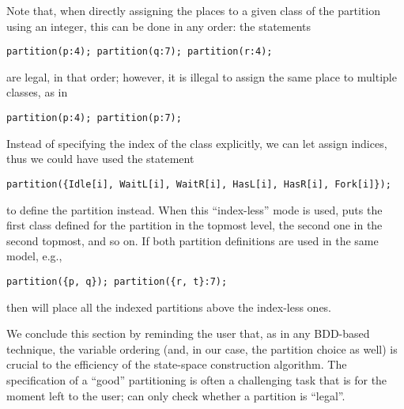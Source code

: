 Note that, when directly assigning the places to a given class of the
partition using an integer, this can be done in any order:
the statements
\begin{lstlisting}
partition(p:4); partition(q:7); partition(r:4); 
\end{lstlisting}
are legal, in that order; however, it is illegal to assign the same
place  to multiple classes, as in
\begin{lstlisting}
partition(p:4); partition(p:7);
\end{lstlisting}


Instead of specifying the index of the class explicitly, we can let
{\smart} assign indices, thus we could have used the statement
\begin{lstlisting}
partition({Idle[i], WaitL[i], WaitR[i], HasL[i], HasR[i], Fork[i]});
\end{lstlisting}
to define the partition instead.
When this ``index-less'' mode is used, {\smart} puts the first
class defined for the partition in the topmost level, the second one in
the second topmost, and so on.
If both partition definitions are used in the same model,
e.g.,
\begin{lstlisting}
partition({p, q}); partition({r, t}:7);
\end{lstlisting}
then {\smart} will place all the indexed partitions above the index-less ones.


We conclude this section by reminding the user that,
as in any BDD-based technique, the variable ordering (and, in our case,
the partition choice as well)
is crucial to the efficiency of the state-space construction algorithm.
The specification of a ``good'' partitioning is often a challenging
task that is for the moment left to the user;
{\smart} can only check whether a partition is ``legal''.


